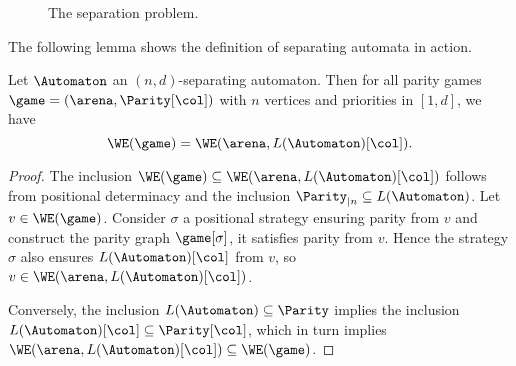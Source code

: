 \begin{figure}[!ht]
\centering
\caption{The separation problem.}
\label{3-fig:separation}
\end{figure}

The following lemma shows the definition of separating automata in action.

\begin{lemma}
\label{3-lem:separating_automata}
Let $\Automaton$ an $(n,d)$-separating automaton.
Then for all parity games $\game = (\arena,\Parity[\col])$ with $n$ vertices and priorities in $[1,d]$, 
we have
\[
\WE(\game) = \WE(\arena,L(\Automaton)[\col]).
\]
\end{lemma}

\begin{proof}
The inclusion $\WE(\game) \subseteq \WE(\arena,L(\Automaton)[\col])$ follows from positional determinacy and the inclusion 
$\Parity_{\mid n} \subseteq L(\Automaton)$.
Let $v \in \WE(\game)$.
Consider $\sigma$ a positional strategy ensuring parity from $v$ and construct the parity graph $\game[\sigma]$, it satisfies parity from $v$.
Hence the strategy $\sigma$ also ensures $L(\Automaton)[\col]$ from $v$, so $v \in \WE(\arena,L(\Automaton)[\col])$.

Conversely, the inclusion $L(\Automaton) \subseteq \Parity$ implies the inclusion 
$L(\Automaton)[\col] \subseteq \Parity[\col]$, which in turn implies 
$\WE(\arena,L(\Automaton)[\col]) \subseteq \WE(\game)$.
\end{proof}

